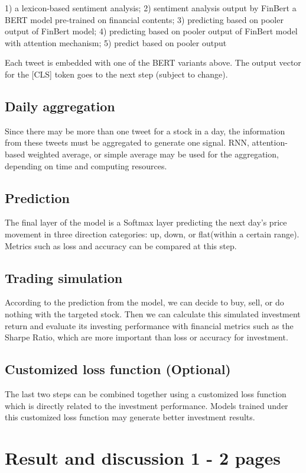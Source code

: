 \documentclass[11pt]{article}
\begin{document}
1) a lexicon-based sentiment analysis; 2) sentiment analysis output by FinBert a BERT model pre-trained on financial contents; 3) predicting based on pooler output of FinBert model; 4) predicting based on pooler output of FinBert model with attention mechanism; 5) predict based on pooler output 

Each tweet is embedded with one of the BERT variants above. The output vector for the [CLS] token goes to the next step (subject to change).

\subsection{Daily aggregation}
Since there may be more than one tweet for a stock in a day, the information from these tweets must be aggregated to generate one signal. RNN, attention-based weighted average, or simple average may be used for the aggregation, depending on time and computing resources. 

\subsection{Prediction}
The final layer of the model is a Softmax layer predicting the next day's price movement in three direction categories: up, down, or flat(within a certain range). Metrics such as loss and accuracy can be compared at this step.

\subsection{Trading simulation}
According to the prediction from the model, we can decide to buy, sell, or do nothing with the targeted stock. Then we can calculate this simulated investment return and evaluate its investing performance with financial metrics such as the Sharpe Ratio, which are more important than loss or accuracy for investment.

\subsection{Customized loss function (Optional)}
The last two steps can be combined together using a customized loss function which is directly related to the investment performance. Models trained under this customized loss function may generate better investment results.

\section{Result and discussion 1 - 2 pages}
\end{document}
